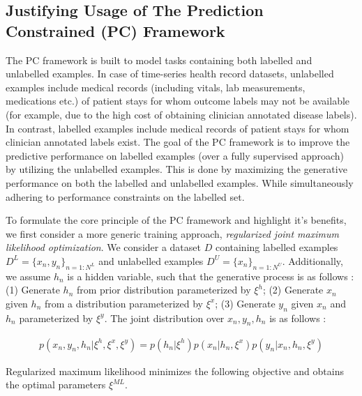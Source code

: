 \subsection{Justifying Usage of The Prediction Constrained (PC) Framework}
The PC framework is built to model tasks containing both labelled and unlabelled examples. In case of time-series health record datasets, unlabelled examples include medical records (including vitals, lab measurements, medications etc.) of patient stays for whom outcome labels may not be available (for example, due to the high cost of obtaining clinician annotated disease labels). In contrast, labelled examples include medical records of patient stays for whom clinician annotated labels exist. The goal of the PC framework is to improve the predictive performance on labelled examples (over a fully supervised approach) by utilizing the unlabelled examples. This is done by maximizing the generative performance on both the labelled and unlabelled examples. While simultaneously adhering to performance constraints on the labelled set.

To formulate the core principle of the PC framework and highlight it's benefits, we first consider a more generic training approach,  \textit{regularized joint maximum likelihood optimization}. We consider a dataset $D$ containing labelled examples $D^L=\{x_n, y_n\}_{n=1:N^{L}}$ and unlabelled examples $D^{U}=\{x_n\}_{n=1:N^{U}}$. Additionally, we assume $h_n$ is a hidden variable, such that the generative process is as follows : (1) Generate $h_n$ from prior distribution parameterized by $\xi^h$; (2) Generate $x_n$ given $h_n$ from a distribution parameterized by $\xi^x$; (3) Generate $y_n$ given $x_n$ and $h_n$ parameterized by $\xi^y$. The joint distribution over $x_n, y_n, h_n$ is as follows :

\begin{align}
    p(x_n, y_n, h_n|\xi^h, \xi^x, \xi^y)=p(h_n|\xi^h)p(x_n|h_n, \xi^x)p(y_n|x_n, h_n, \xi^y)
\end{align}

Regularized maximum likelihood minimizes the following objective and obtains the optimal parameters $\xi^{ML}$.


